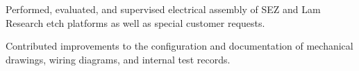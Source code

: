 \begin{tightemize}
    \item Performed, evaluated, and supervised electrical assembly of SEZ and Lam Research etch platforms as well as special customer requests.  
    \item Contributed improvements to the configuration and documentation of mechanical drawings, wiring diagrams, and internal test records.
\end{tightemize}